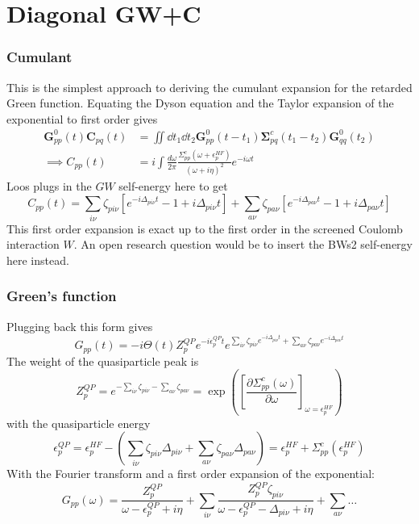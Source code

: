 
\section{Diagonal GW+C}


\begin{frame}
    \frametitle{Cumulant}

This is the simplest approach to deriving the cumulant expansion for the retarded Green function. Equating the Dyson equation and the Taylor expansion of the exponential to first order gives
\begin{align}
    \bm{G}_{pp}^{0}(t) \bm{C}_{pq}(t) &= {\iint \dd t_1 \dd t_2 \bm{G}_{pp}^{0}(t-t_1) \bm{\Sigma}_{pq}^c(t_1 - t_2) \bm{G}_{qq}^{0}(t_2)} \\
\implies C_{pp}(t) &= i \int \frac{d\omega}{2\pi} \frac{ \Sigma_{pp}^c\left(\omega+\epsilon_p^{HF}\right)}{(\omega + i \eta)^2} e^{-i \omega t}
\end{align}
Loos plugs in the $GW$ self-energy here to get
\begin{equation}
    C_{pp}(t) = \sum_{i\nu} \zeta_{pi\nu} \left[ e^{-i\Delta_{pi\nu} t} - 1 + i\Delta_{pi\nu} t \right] + \sum_{a\nu} \zeta_{pa\nu} \left[ e^{-i\Delta_{pa\nu} t} - 1 + i\Delta_{pa\nu} t \right]
\end{equation}
\color{orange}
This first order expansion is exact up to the first order in the screened Coulomb interaction $W$. An open research question would be to insert the BWs2 self-energy here instead.

\end{frame}

\begin{frame}
    \frametitle{Green's function}
Plugging back this form gives
\begin{equation}
    G_{pp}(t) = -i \Theta(t) Z_p^{QP} e^{-i \epsilon_p^{QP} t} e^{\sum_{i\nu} \zeta_{pi\nu} e^{-i\Delta_{pi\nu} t} + \sum_{a\nu} \zeta_{pa\nu} e^{-i\Delta_{pa\nu} t}}
\end{equation}
The weight of the quasiparticle peak is
\begin{equation}
    Z_p^{QP} = e^{-\sum_{i\nu} \zeta_{pi\nu} - \sum_{a\nu} \zeta_{pa\nu}} = \exp\left(\left[\frac{\partial \Sigma_{pp}^c(\omega)}{\partial \omega}\right]_{\omega = \epsilon_p^{HF}}\right)
\end{equation}
with the quasiparticle energy
\begin{equation}
    \epsilon_p^{QP} = \epsilon_p^{HF} - \left(\sum_{i\nu} \zeta_{pi\nu} \Delta_{pi\nu} + \sum_{a\nu} \zeta_{pa\nu} \Delta_{pa\nu}\right) = \epsilon_p^{HF} + \Sigma_{pp}^c\left(\epsilon_p^{HF}\right)
\end{equation}
With the Fourier transform and a first order expansion of the exponential:
\begin{equation}
    G_{pp}(\omega) = \frac{Z_p^{QP}}{\omega - \epsilon_p^{QP} + i\eta} + \sum_{i\nu} \frac{Z_p^{QP} \zeta_{pi\nu}}{\omega - \epsilon_p^{QP} - \Delta_{pi\nu} + i\eta} + \sum_{a\nu}  \ldots
\end{equation}



\end{frame}

